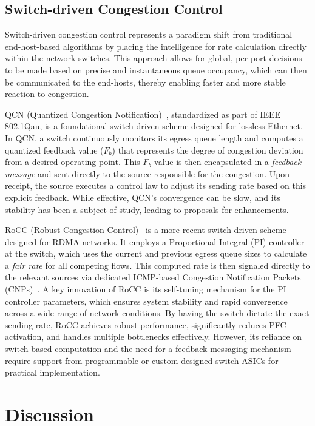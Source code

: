 \documentclass[11pt,en]{elegantpaper}
\begin{document}
\subsection{Switch-driven Congestion Control}
\label{sec:switch-driven}

Switch-driven congestion control represents a paradigm shift from traditional end-host-based algorithms by placing the intelligence for rate calculation directly within the network switches. This approach allows for global, per-port decisions to be made based on precise and instantaneous queue occupancy, which can then be communicated to the end-hosts, thereby enabling faster and more stable reaction to congestion.

QCN (Quantized Congestion Notification)~\cite{qcn}, standardized as part of IEEE 802.1Qau, is a foundational switch-driven scheme designed for lossless Ethernet. In QCN, a switch continuously monitors its egress queue length and computes a quantized feedback value (\(F_b\)) that represents the degree of congestion deviation from a desired operating point. This \(F_b\) value is then encapsulated in a \textit{feedback message} and sent directly to the source responsible for the congestion. Upon receipt, the source executes a control law to adjust its sending rate based on this explicit feedback. While effective, QCN's convergence can be slow, and its stability has been a subject of study, leading to proposals for enhancements.

RoCC (Robust Congestion Control)~\cite{rocc} is a more recent switch-driven scheme designed for RDMA networks. It employs a Proportional-Integral (PI) controller at the switch, which uses the current and previous egress queue sizes to calculate a \textit{fair rate} for all competing flows. This computed rate is then signaled directly to the relevant sources via dedicated ICMP-based Congestion Notification Packets (CNPs)~\cite{qcn}. A key innovation of RoCC is its self-tuning mechanism for the PI controller parameters, which ensures system stability and rapid convergence across a wide range of network conditions. By having the switch dictate the exact sending rate, RoCC achieves robust performance, significantly reduces PFC activation, and handles multiple bottlenecks effectively. However, its reliance on switch-based computation and the need for a feedback messaging mechanism require support from programmable or custom-designed switch ASICs for practical implementation.


\section{Discussion}
\label{sec:discussion}
\end{document}
